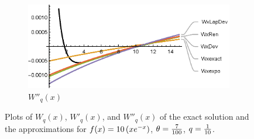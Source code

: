 \begin{figure}[!h]
\begin{subfigure}[b]{0.8\textwidth}
    \end{subfigure}
    ~
    \\
    \begin{subfigure}[b]{0.8\textwidth}
        \includegraphics[width=\textwidth]{AzcueMW2}
        \caption{$W''_q(x)$}
        \label{fig:AzcueMW2}
    \end{subfigure}
    \caption{Plots of $W_q(x)$, $W'_q(x)$, and $W''_q(x)$ of the exact solution and the approximations for $f(x) = 10 \left(x e^{-x}\right)$, $\theta = \frac{7}{100}$, $q=\frac{1}{10}$.}\label{fig:AzcueM}
\end{figure}


